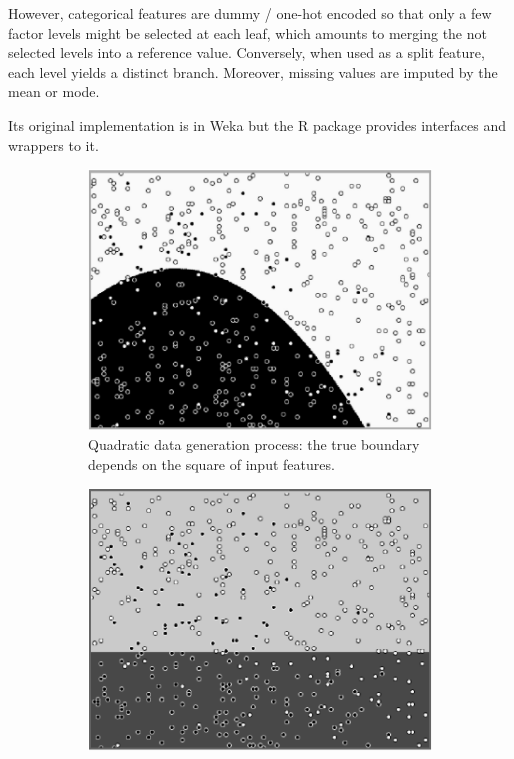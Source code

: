 However, categorical features are dummy / one-hot encoded so that only a few factor levels might be selected at each leaf, which amounts to merging the not selected levels into a reference value. Conversely, when used as a split feature, each level yields a distinct branch. Moreover, missing values are imputed by the mean or mode.

Its original implementation is in Weka but the \textsf{R} package  provides interfaces and wrappers to it.

\begin{figure}[!htb]
{\setlength{\parindent}{0cm}}
\begin{center}
\centering
\begin{subfigure}[t]{0.25\textwidth}
\centering
\includegraphics[width=\textwidth]{figures/chapitre6/lmt_generation.png}
\caption{\label{fig:lmt1} Quadratic data generation process: the true boundary depends on the square of input features.}
\end{subfigure}%
\hspace*{1cm}
\begin{subfigure}[t]{0.25\textwidth}
\centering
\includegraphics[width=\textwidth]{figures/chapitre6/lmt_tree_1.png}

\end{subfigure}
\end{center}
\end{figure}
